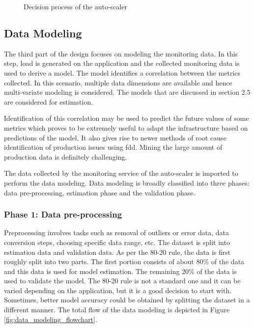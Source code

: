\documentclass[article,type=msc,colorback,12pt,accentcolor=tud8b,table]{tudthesis}
\begin{document}
	  	 	 \begin{figure}[!h]
	  	 	 	\begin{center}
	  	 	 		\makebox[\textwidth]{\texttt{[image: C3]}}
	  	 	 	\end{center}
	  	 	 	\caption{Decision process of the auto-scaler}
	  	 	 	\label{fig:autoscaler}
	  	 	 \end{figure}

 	\subsection{Data Modeling}
 	
 	The third part of the design focuses on modeling the monitoring data. In this step, load is generated on the application and the collected monitoring data is used to derive a model. The model identifies a correlation between the metrics collected. In this scenario, multiple data dimensions are available and hence multi-variate modeling is considered. The models that are discussed in section 2.5 are considered for estimation. 
 	
	 Identification of this correlation may be used to predict the future values of some metrics which proves to be extremely useful to adapt the infrastructure based on predictions of the model. It also gives rise to newer methods of root cause identification of production issues using \gls{fdd}. Mining the large amount of production data is definitely challenging.
 	
 	The data collected by the monitoring service of the auto-scaler is imported to perform the data modeling. Data modeling is broadly classified into three phases: data pre-processing, estimation phase and the validation phase. 
 	
 	 \subsubsection{Phase 1: Data pre-processing}
 	
 	Preprocessing involves tasks such as removal of outliers or error data, data conversion steps, choosing specific data range, etc. The dataset is split into estimation data and validation data. As per the 80-20 rule, the data is first roughly split into two parts. The first portion consists of about 80\% of the data and this data is used for model estimation. The remaining 20\% of the data is used to validate the model. The 80-20 rule is not a standard one and it can be varied depending on the application, but it is a good decision to start with. Sometimes, better model accuracy could be obtained by splitting the dataset in a different manner. The total flow of the data modeling is depicted in Figure \ref{fig:data_modeling_flowchart}.
 	
\end{document}
